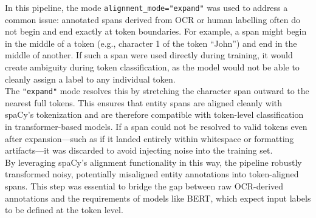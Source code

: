 \documentclass{article}
\begin{document}
In this pipeline, the mode \texttt{alignment\_mode="expand"} was used to address a common issue: annotated spans derived from OCR or human labelling often do not begin and end exactly at token boundaries. For example, a span might begin in the middle of a token (e.g., character 1 of the token ``John'') and end in the middle of another. If such a span were used directly during training, it would create ambiguity during token classification, as the model would not be able to cleanly assign a label to any individual token. \\

The \texttt{"expand"} mode resolves this by stretching the character span outward to the nearest full tokens. This ensures that entity spans are aligned cleanly with spaCy’s tokenization and are therefore compatible with token-level classification in transformer-based models. If a span could not be resolved to valid tokens even after expansion—such as if it landed entirely within whitespace or formatting artifacts—it was discarded to avoid injecting noise into the training set. \\

By leveraging spaCy’s alignment functionality in this way, the pipeline robustly transformed noisy, potentially misaligned entity annotations into token-aligned spans. This step was essential to bridge the gap between raw OCR-derived annotations and the requirements of models like BERT, which expect input labels to be defined at the token level.
\end{document}

